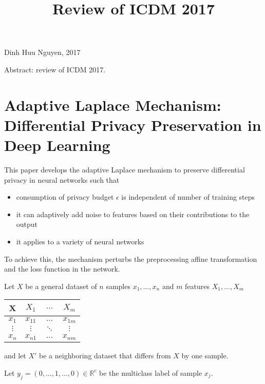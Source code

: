 \documentclass[12pt]{amsart}
\title{Review of ICDM 2017}
\theoremstyle{definition}
\begin{document}
\maketitle

\begin{center}
Dinh Huu Nguyen, 2017
\end{center}
\vspace{20pt}

Abstract: review of ICDM 2017.
\vspace{20pt}

\tableofcontents

\section{Adaptive Laplace Mechanism: Differential Privacy Preservation in Deep Learning} This paper \cite{ALM} develops the adaptive Laplace mechanism to preserve differential privacy in neural networks such that
\begin{itemize}
\item consumption of privacy budget $\epsilon$ is independent of number of training steps
\item it can adaptively add noise to features based on their contributions to the output
\item it applies to a variety of neural networks
\end{itemize}

To achieve this, the mechanism perturbs the preprocessing affine transformation and the loss function in the network.

Let $X$ be a general dataset of $n$ samples $x_1, \dots , x_n$ and $m$ features $X_1, \dots, X_m$
\vspace{10pt}
\begin{center}
\begin{tabular}{c | c c c}
X & $X_1$ & $\dots$ & $X_m$ \\
\hline
$x_1$ & $x_{11}$ & $\dots$ & $x_{1m}$ \\
$\vdots$ & $\vdots$ & $\ddots$ & $\vdots$ \\
$x_n$ & $x_{n1}$ & $\dots$ & $x_{nm}$ \\
\end{tabular}
\end{center}
\vspace{10pt}
and let $X'$ be a neighboring dataset that differs from $X$ by one sample.

Let $y_j = (0, \dots , 1 , \dots , 0) \in \mathbb{R}^c$ be the multiclass label of sample $x_j$.
\end{document}
